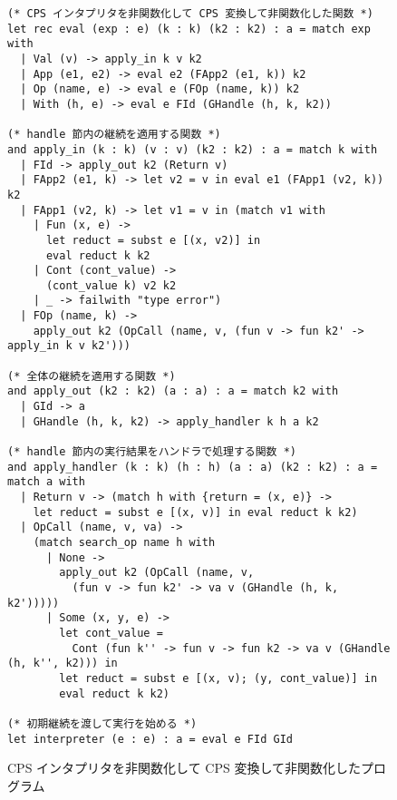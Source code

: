 \begin{figure}
\begin{verbatim}
(* CPS インタプリタを非関数化して CPS 変換して非関数化した関数 *)
let rec eval (exp : e) (k : k) (k2 : k2) : a = match exp with
  | Val (v) -> apply_in k v k2
  | App (e1, e2) -> eval e2 (FApp2 (e1, k)) k2
  | Op (name, e) -> eval e (FOp (name, k)) k2
  | With (h, e) -> eval e FId (GHandle (h, k, k2))

(* handle 節内の継続を適用する関数 *)
and apply_in (k : k) (v : v) (k2 : k2) : a = match k with
  | FId -> apply_out k2 (Return v)
  | FApp2 (e1, k) -> let v2 = v in eval e1 (FApp1 (v2, k)) k2
  | FApp1 (v2, k) -> let v1 = v in (match v1 with
    | Fun (x, e) ->
      let reduct = subst e [(x, v2)] in
      eval reduct k k2
    | Cont (cont_value) ->
      (cont_value k) v2 k2
    | _ -> failwith "type error")
  | FOp (name, k) ->
    apply_out k2 (OpCall (name, v, (fun v -> fun k2' -> apply_in k v k2')))

(* 全体の継続を適用する関数 *)
and apply_out (k2 : k2) (a : a) : a = match k2 with
  | GId -> a
  | GHandle (h, k, k2) -> apply_handler k h a k2

(* handle 節内の実行結果をハンドラで処理する関数 *)
and apply_handler (k : k) (h : h) (a : a) (k2 : k2) : a = match a with
  | Return v -> (match h with {return = (x, e)} ->
    let reduct = subst e [(x, v)] in eval reduct k k2)
  | OpCall (name, v, va) ->
    (match search_op name h with
      | None ->
        apply_out k2 (OpCall (name, v,
          (fun v -> fun k2' -> va v (GHandle (h, k, k2')))))
      | Some (x, y, e) ->
        let cont_value =
          Cont (fun k'' -> fun v -> fun k2 -> va v (GHandle (h, k'', k2))) in
        let reduct = subst e [(x, v); (y, cont_value)] in
        eval reduct k k2)

(* 初期継続を渡して実行を始める *)
let interpreter (e : e) : a = eval e FId GId
\end{verbatim}
\caption{CPS インタプリタを非関数化して CPS 変換して非関数化したプログラム}
\label{figure:4defun}
\end{figure}

